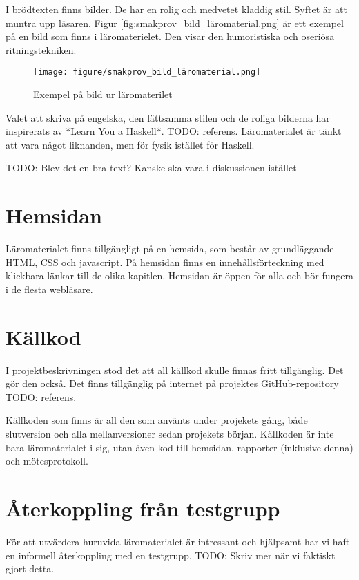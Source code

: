 \begin{binge}
I brödtexten finns bilder. De har en rolig och medvetet kladdig stil. Syftet är att muntra upp läsaren. Figur \ref{fig:smakprov_bild_läromaterial.png} är ett exempel på en bild som finns i läromaterielet. Den visar den humoristiska och oseriösa ritningstekniken.

\begin{figure}
  \texttt{[image: figure/smakprov\_bild\_läromaterial.png]}
  \caption{Exempel på bild ur läromaterilet}
  \label{fig:smakprov_bild_läromaterial}
\end{figure}

Valet att skriva på engelska, den lättsamma stilen och de roliga bilderna har inspirerats av *Learn You a Haskell*. TODO: referens. Läromaterialet är tänkt att vara något liknanden, men för fysik istället för Haskell.

TODO: Blev det en bra text? Kanske ska vara i diskussionen istället

\section{Hemsidan}

Läromaterialet finns tillgängligt på en hemsida, som består av grundläggande HTML, CSS och javascript. På hemsidan finns en innehållsförteckning med klickbara länkar till de olika kapitlen. Hemsidan är öppen för alla och bör fungera i de flesta webläsare.

\section{Källkod}

I projektbeskrivningen stod det att all källkod skulle finnas fritt tillgänglig. Det gör den också. Det finns tillgänglig på internet på projektes GitHub-repository TODO: referens.

Källkoden som finns är all den som använts under projekets gång, både slutversion och alla mellanversioner sedan projekets början. Källkoden är inte bara läromaterialet i sig, utan även kod till hemsidan, rapporter (inklusive denna) och mötesprotokoll.

\section{Återkoppling från testgrupp}

För att utvärdera huruvida läromaterialet är intressant och hjälpsamt har vi haft en informell återkoppling med en testgrupp. TODO: Skriv mer när vi faktiskt gjort detta.

\end{binge}
